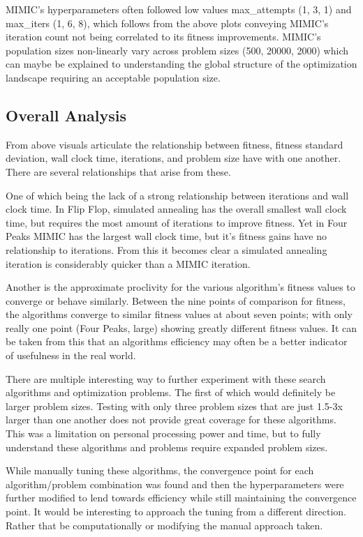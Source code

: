 \documentclass{article}
\begin{document}
MIMIC's hyperparameters often followed low values max\_attempts (1, 3, 1) and max\_iters (1, 6, 8), which follows from the above plots conveying MIMIC's iteration count not being correlated to its fitness improvements. MIMIC's population sizes non-linearly vary across problem sizes (500, 20000, 2000) which can maybe be explained to understanding the global structure of the optimization landscape requiring an acceptable population size.

\subsection{Overall Analysis}

From above visuals articulate the relationship between fitness, fitness standard deviation, wall clock time, iterations, and problem size have with one another. There are several relationships that arise from these.

One of which being the lack of a strong relationship between iterations and wall clock time. In Flip Flop, simulated annealing has the overall smallest wall clock time, but requires the most amount of iterations to improve fitness. Yet in Four Peaks MIMIC has the largest wall clock time, but it's fitness gains have no relationship to iterations. From this it becomes clear a simulated annealing iteration is considerably quicker than a MIMIC iteration.

Another is the approximate proclivity for the various algorithm's fitness values to converge or behave similarly. Between the nine points of comparison for fitness, the algorithms converge to similar fitness values at about seven points; with only really one point (Four Peaks, large) showing greatly different fitness values. It can be taken from this that an algorithms efficiency may often be a better indicator of usefulness in the real world.

There are multiple interesting way to further experiment with these search algorithms and optimization problems. The first of which would definitely be larger problem sizes. Testing with only three problem sizes that are just 1.5-3x larger than one another does not provide great coverage for these algorithms. This was a limitation on personal processing power and time, but to fully understand these algorithms and problems require expanded problem sizes.

While manually tuning these algorithms, the convergence point for each algorithm/problem combination was found and then the hyperparameters were further modified to lend towards efficiency while still maintaining the convergence point. It would be interesting to approach the tuning from a different direction. Rather that be computationally or modifying the manual approach taken.
\end{document}
